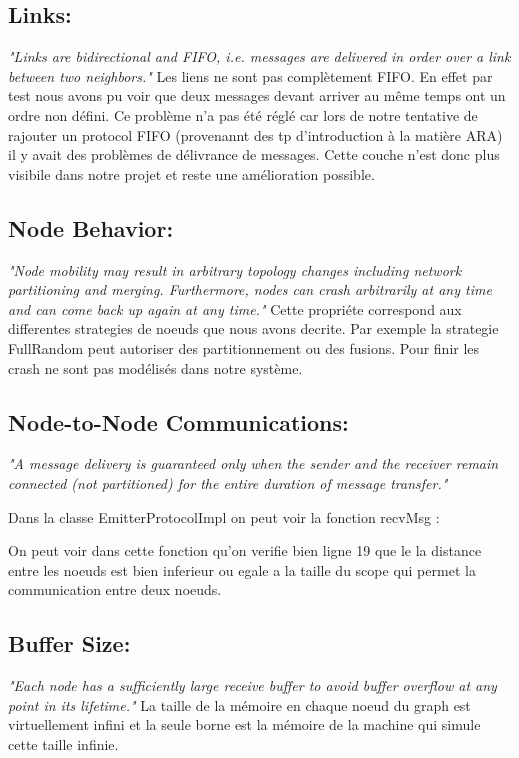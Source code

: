 \documentclass[11pt,a4paper,sans]{report}
\begin{document}
	\subsection{Links:}
	\textit{"Links are bidirectional and FIFO, i.e. messages are delivered in order over a link between two neighbors."}
	Les liens ne sont pas complètement FIFO. En effet par test nous avons pu voir que deux messages devant arriver au même temps ont un ordre non défini. Ce problème n'a pas été réglé car lors de notre tentative de rajouter un protocol FIFO (provenannt des tp d'introduction à la matière ARA) il y avait des problèmes de délivrance de messages. Cette couche n'est donc plus visibile dans notre projet et reste une amélioration possible.

	\subsection{Node Behavior:}
	\textit{"Node mobility may result in arbitrary topology changes including network partitioning and merging. Furthermore, nodes can crash arbitrarily at any time and can come back up again at any time."}
	Cette propriéte correspond aux differentes strategies de noeuds que nous avons decrite. Par exemple la strategie FullRandom peut autoriser des partitionnement ou des fusions. Pour finir les crash ne sont pas modélisés dans notre système.

	\subsection{Node-to-Node Communications:}
	\textit{"A message delivery is guaranteed only when the sender and the receiver remain connected (not partitioned) for the entire duration of message transfer."}

	Dans la classe EmitterProtocolImpl on peut voir la fonction recvMsg :

	On peut voir dans cette fonction qu'on verifie bien ligne 19 que le la distance entre les noeuds est bien inferieur ou egale a la taille du scope qui permet la communication entre deux noeuds.

	\subsection{Buffer Size:}
	\textit{"Each node has a sufficiently large receive buffer to avoid buffer overflow at any point in its lifetime."}
	La taille de la mémoire en chaque noeud du graph est virtuellement infini et la seule borne est la mémoire de la machine qui simule cette taille infinie.
\end{document}
